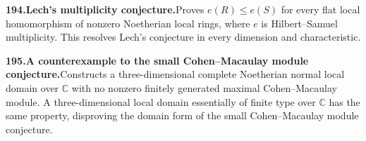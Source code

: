 \documentclass[11pt,a4paper]{article}
\begin{document}
  \par \begin{minipage}{\linewidth}
  \fontsize{10.5}{12.6}\selectfont\RaggedRight
  \hypertarget{result 194}{}
  {\bfseries\textcolor{muted}{194.}\enspace Lech's multiplicity conjecture.}\enspace Proves $e(R)\le e(S)$ for every flat local homomorphism of nonzero Noetherian local rings, where $e$ is Hilbert--Samuel multiplicity. This resolves Lech's conjecture in every dimension and characteristic.\par
  \end{minipage}\par\vspace{5pt}



  \par \begin{minipage}{\linewidth}
  \fontsize{10.5}{12.6}\selectfont\RaggedRight
  \hypertarget{result 195}{}
  {\bfseries\textcolor{muted}{195.}\enspace A counterexample to the small Cohen--Macaulay module conjecture.}\enspace Constructs a three-dimensional complete Noetherian normal local domain over $\mathbb C$ with no nonzero finitely generated maximal Cohen--Macaulay module. A three-dimensional local domain essentially of finite type over $\mathbb C$ has the same property, disproving the domain form of the small Cohen--Macaulay module conjecture.\par
  \end{minipage}\par\vspace{5pt}
\end{document}
